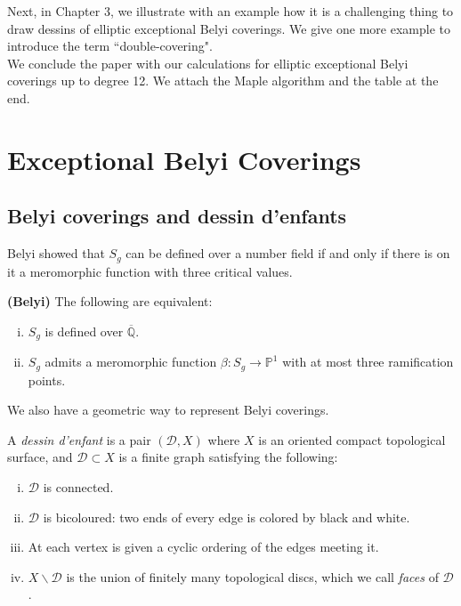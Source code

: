 Next, in Chapter 3, we illustrate with an example how it is a challenging thing to draw dessins of elliptic
exceptional Belyi coverings. We give one more example to introduce the term ``double-covering".\\

We conclude the paper with our calculations for elliptic exceptional Belyi coverings up to degree 12. We attach the Maple algorithm and the table at the end. 
\section{Exceptional Belyi Coverings}
\subsection{Belyi coverings and dessin d'enfants}
Belyi showed that $S_g$ can be defined over a number field if and only if there is on it a meromorphic function with three critical values.
\begin{thm}{\bf (Belyi)}
The following are equivalent:
\begin{enumerate}[(i)]
    \item $S_g$ is defined over $\overline{\mathbb{Q}}$.
    \item $S_g$ admits a meromorphic function $\beta: S_g \rightarrow \mathbb{P}^{1}$ with at most three ramification points.  
\end{enumerate}
\end{thm} 


We also have a geometric way to represent Belyi coverings.

\begin{dfn}
 A \textit{dessin d'enfant} is a pair $(\mathcal{D}, X)$ where $X$ is an oriented compact topological surface, and $\mathcal{D} \subset X$ is a finite graph satisfying the following:

\begin{enumerate}[(i)]
    \item $\mathcal{D}$ is connected.
    \item $\mathcal{D}$ is bicoloured: two ends of every edge is colored by black and white.
    \item At each vertex is given a cyclic ordering of the edges meeting it.
    \item  $X \backslash \mathcal{D}$ is the union of finitely many topological discs, which we call \textit{faces} of $\mathcal{D}$.   
\end{enumerate}
\end{dfn}


